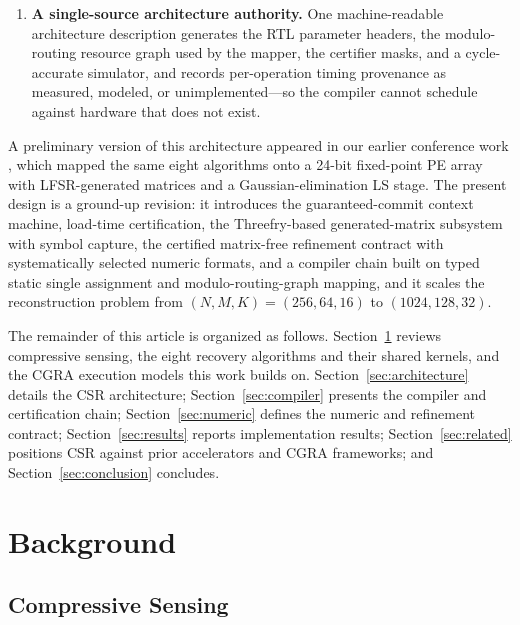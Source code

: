 \begin{enumerate}
  \cite{roy2020ge_omp}; the fixed-point formats (18-bit data, 27-bit solver,
  62-bit accumulation) were selected by a systematic width sweep rather than
  ad hoc choice, and support-set mutation is transactional with atomic
  commit and rollback.
  \item \textbf{A single-source architecture authority.} One machine-readable
  architecture description generates the RTL parameter headers, the
  modulo-routing resource graph used by the mapper, the certifier masks, and
  a cycle-accurate simulator, and records per-operation timing provenance as
  measured, modeled, or unimplemented---so the compiler cannot schedule
  against hardware that does not exist.
\end{enumerate}

A preliminary version of this architecture appeared in our earlier
conference work \cite{csr_v2}, which mapped the same eight algorithms onto a
24-bit fixed-point PE array with LFSR-generated matrices and a
Gaussian-elimination LS stage. The present design is a ground-up revision:
it introduces the guaranteed-commit context machine, load-time
certification, the Threefry-based generated-matrix subsystem with symbol
capture, the certified matrix-free refinement contract with
systematically selected numeric formats, and a compiler chain built on typed
static single assignment and modulo-routing-graph mapping, and it scales the
reconstruction problem from $(N,M,K)=(256,64,16)$ to $(1024,128,32)$.

The remainder of this article is organized as follows.
Section~\ref{sec:background} reviews compressive sensing, the eight recovery
algorithms and their shared kernels, and the CGRA execution models this work
builds on. Section~\ref{sec:architecture} details the CSR architecture;
Section~\ref{sec:compiler} presents the compiler and certification chain;
Section~\ref{sec:numeric} defines the numeric and refinement contract;
Section~\ref{sec:results} reports implementation results;
Section~\ref{sec:related} positions CSR against prior accelerators and CGRA
frameworks; and Section~\ref{sec:conclusion} concludes.


\section{Background}
\label{sec:background}

\subsection{Compressive Sensing}
\label{sec:background_cs}

